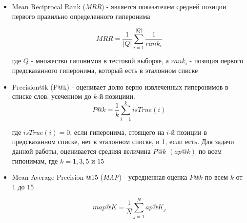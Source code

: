 \begin{itemize}

\item Mean Reciprocal Rank (\textit{MRR}) - является показателем средней позиции первого правильно определенного гиперонима

$$MRR= \frac{1}{|Q|} \sum^{|Q|}_{i=1} \frac{1}{rank_i}$$

где $Q$ - множество гипонимов в тестовой выборке, а
$rank_i$ - позиция первого предсказанного гиперонима, который
есть в эталонном списке

\item Precision@k (P@k) - оценивает долю верно извлеченных гиперонимов в списке
слов, усеченном до $k$-й позициии.
$$P@k = \frac{1}{k} \sum^k_{i=1} isTrue(i)$$

где $isTrue(i) = 0$, если гиперонима, стоящего на $i$-й позиции в
предсказанном списке, нет в эталонном списке, и 1, если есть.
Для задачи данной работы, оценивается средняя величина $P@k$ $(ap@k)$ по всем гипонимам, где $k = 1, 3, 5$ и $15$

\item Mean Average Precision @15 (\textit{MAP}) - усредненная оценка $P@k$ по всем $k$ от $1$ до $15$

$$map@K = \frac{1}{N} \sum^N_{j=1} ap@K_j$$

\end{itemize}
